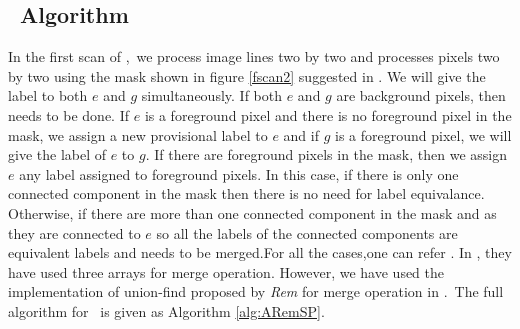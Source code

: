 \subsection{\aremsp\ Algorithm}
In the first scan of \aremsp,\ we process image lines two by two and processes
pixels two by two using the mask shown in figure \ref{fscan2} suggested in \cite{He2012_ARun}. 
We will give the label to both $e$ and $g$ simultaneously. If both $e$ and $g$ are background pixels,
then needs to be done. If $e$ is a foreground pixel and there is no foreground pixel in the mask, we assign a 
new provisional label to $e$ and if $g$ is a foreground pixel, we will give the
label of $e$ to $g$. If there are foreground pixels in the mask, then we assign $e$ any label assigned to 
foreground pixels. In this case, if there is only one connected component in the mask then there is 
no need for label equivalance. Otherwise, if there are more than one connected component in the mask and as 
they are connected to $e$ so all the labels of the connected components are
equivalent labels and needs to be merged.For all the cases,one can refer \cite{He2012_ARun}.
In \cite{He2012_ARun}, they have used three arrays for merge operation. However, we have used the implementation of 
union-find proposed by {\em Rem} \cite{Patwary2010_RemSP} for merge operation in
\aremsp.\ The full algorithm for \aremsp\ is given as Algorithm
\ref{alg:ARemSP}.





 
